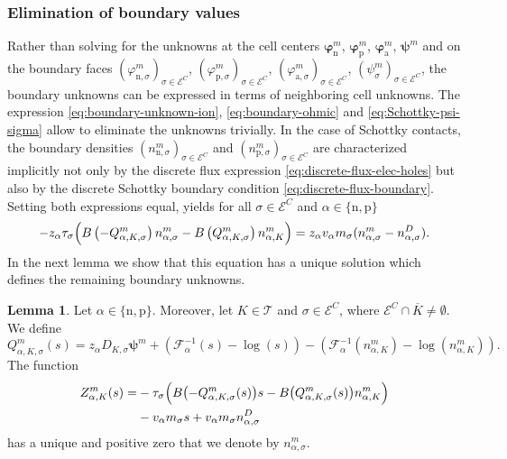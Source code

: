 \documentclass[10pt,a4paper, final]{article}
\def\electrons{\text{n}}
\def\holes{\text{p}}
\def\ions{\text{a}}
\theoremstyle{definition}								%
\newtheorem{lemma}[theorem]{Lemma}					%
\numberwithin{equation}{section}
\numberwithin{figure}{section}
\numberwithin{theorem}{section}
\begin{document}
\subsubsection{Elimination of boundary values} \label{sec:discrete-boundary-values}
Rather than solving for the unknowns at the cell centers $\boldsymbol{\varphi}_\electrons^m$, $\boldsymbol{\varphi}_\holes^m$, $\boldsymbol{\varphi}_\ions^m$, $\boldsymbol{\psi}^m$ and on the boundary faces $ (\varphi_{\electrons, \sigma}^{m})_{\sigma\in{\mathcal E}^C}$, $(\varphi_{\holes, \sigma}^{m})_{\sigma\in{\mathcal E}^C}$, $(\varphi_{\ions, \sigma}^{m})_{\sigma\in{\mathcal E}^C}$, $(\psi_{\sigma}^{m})_{\sigma\in{\mathcal E}^C}$,  the boundary unknowns can be expressed in terms of neighboring cell unknowns.
The expression \eqref{eq:boundary-unknown-ion}, \eqref{eq:boundary-ohmic} and \eqref{eq:Schottky-psi-sigma} allow to eliminate the unknowns trivially.
In the case of Schottky contacts, the boundary densities $(n_{\electrons, \sigma}^{m})_{\sigma\in{\mathcal E}^C}$ and $(n_{\holes, \sigma}^{m})_{\sigma\in{\mathcal E}^C}$ are characterized implicitly not only by the discrete flux expression \eqref{eq:discrete-flux-elec-holes} but also by the discrete Schottky boundary condition \eqref{eq:discrete-flux-boundary}.
Setting both expressions equal, yields for all $\sigma \in \mathcal{E}^C$ and $\alpha\in\{\electrons, \holes\}$
\begin{equation}\label{eq:implicit_eq_boundary}
    - z_\alpha \tau_\sigma \Bigl( B\left(- Q_{\alpha, K, \sigma}^m \right) n_{\alpha, \sigma}^m - B\left( Q_{\alpha, K, \sigma}^m \right) n_{\alpha, K}^m\Bigr)
    =
    z_\alpha v_\alpha m_\sigma (n_{\alpha, \sigma}^m - n_{\alpha, \sigma}^D).
\end{equation}
In the next lemma we show that this equation has a unique solution which defines the remaining boundary unknowns.
\begin{lemma} \label{lem:Z-zero}
    Let $\alpha \in \{ \electrons, \holes \}$.
    Moreover, let $K \in \mathcal{T}$ and $\sigma \in \mathcal{E}^C$, where $\mathcal{E}^C \cap \overline{K} \neq \emptyset$.
    We define
    \begin{equation*}
        Q_{\alpha, K, \sigma}^m (s) = z_\alpha D_{K, \sigma} \boldsymbol{\psi}^m + \left( \mathcal{F}_\alpha^{-1}(s) - \log(s) \right) - \left(\mathcal{F}_\alpha^{-1}(n_{\alpha, K}^m) - \log(n_{\alpha, K}^m) \right).
    \end{equation*}
    The function
    \begin{equation*}
        \begin{split}
        Z_{\alpha, K}^m (s) =
        &- \tau_\sigma \Bigl(  B \bigl(-Q_{\alpha, K, \sigma}^m(s)\bigr) s - B\bigl(Q_{\alpha, K, \sigma}^m (s) \bigr) n_{\alpha, K}^m \Bigr)\\
        &- v_\alpha m_\sigma s + v_\alpha m_\sigma n_{\alpha, \sigma}^D
        \end{split}
    \end{equation*}
    has a unique and positive zero that we denote by $n_{\alpha, \sigma}^m$.
\end{lemma}
\end{document}
